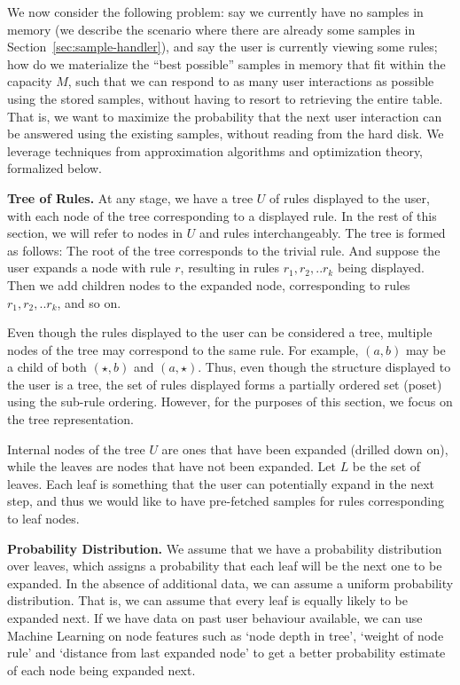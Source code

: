 \documentclass[10pt,journal,compsoc]{IEEEtran}
\newcounter{prob}
\newcommand{\stitle}[1]{\vspace{0.5em}\noindent\textbf{#1}}
\begin{document}
{We now consider the following problem: say we currently have no
samples in memory (we describe the scenario where there are already 
some samples in Section~\ref{sec:sample-handler}), and say the user is currently viewing some rules; how do we
materialize the ``best possible'' samples in memory that fit within the capacity $M$,
such that we can respond to as many user interactions as possible using the stored samples,
without having to resort to retrieving the entire table.
That is, we want to maximize the probability that the next user interaction
can be answered using the existing samples, without reading from the hard disk. 
We leverage techniques from approximation algorithms and optimization theory, formalized
below.


\stitle{Tree of Rules.}
At any stage, we have a tree $U$ of rules displayed to the user, 
with each node of the tree corresponding to a displayed rule. 
In the rest of this section, we will refer to nodes in $U$ and rules interchangeably.
The tree is formed as follows: The root of the tree corresponds to the trivial rule. 
And suppose the user expands a node with rule $r$, resulting in rules $r_1, r_2, .. r_k$ being displayed. 
Then we add children nodes to the expanded node, corresponding to rules $r_1, r_2, .. r_k$, and so on.

Even though the rules displayed to the user can be considered a tree, 
multiple nodes of the tree may correspond to the same rule. 
For example, $(a, b)$ may be a child of both $(\star, b)$ and $(a, \star)$.
Thus, even though the structure displayed to the user is a tree, 
the set of rules displayed forms a partially ordered set (poset) using the sub-rule ordering. 
However, for the purposes of this section, we focus on the tree representation.


Internal nodes of the tree $U$ are ones that have been expanded (drilled down on), 
while the leaves are nodes that have not been expanded. 
Let $L$ be the set of leaves. 
Each leaf is something that the user can potentially expand in the next step, and thus we would like to have pre-fetched samples for rules corresponding to leaf nodes.

\stitle{Probability Distribution.} 
We assume that we have a probability distribution over leaves, which assigns a probability that each leaf will be the next one to be expanded. In the absence of additional data, we can assume a uniform probability distribution. That is, we can assume that every leaf is equally likely to be expanded next. If we have data on past user behaviour available, we can use Machine Learning on node features such as `node depth in tree', `weight of node rule' and `distance from last expanded node' to get a better probability estimate of each node being expanded next. 


}
\end{document}
